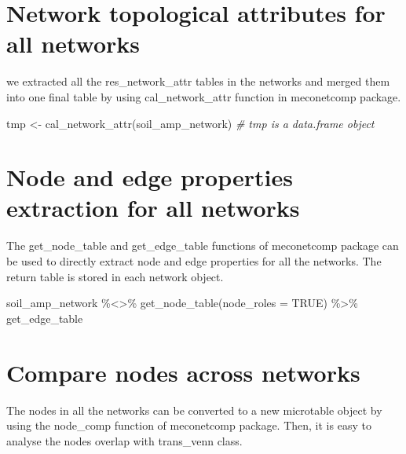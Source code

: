\documentclass[
]{book}
\newenvironment{Shaded}{\begin{snugshade}}{\end{snugshade}}
\newcommand{\AttributeTok}[1]{\textcolor[rgb]{0.77,0.63,0.00}{#1}}
\newcommand{\CommentTok}[1]{\textcolor[rgb]{0.56,0.35,0.01}{\textit{#1}}}
\newcommand{\ConstantTok}[1]{\textcolor[rgb]{0.00,0.00,0.00}{#1}}
\newcommand{\FunctionTok}[1]{\textcolor[rgb]{0.00,0.00,0.00}{#1}}
\newcommand{\NormalTok}[1]{#1}
\newcommand{\OtherTok}[1]{\textcolor[rgb]{0.56,0.35,0.01}{#1}}
\newcommand{\SpecialCharTok}[1]{\textcolor[rgb]{0.00,0.00,0.00}{#1}}
\begin{document}
\hypertarget{network-topological-attributes-for-all-networks}{%
\section{Network topological attributes for all networks}\label{network-topological-attributes-for-all-networks}}

we extracted all the res\_network\_attr tables in the networks and merged them into one final table by using cal\_network\_attr function in meconetcomp package.

\begin{Shaded}
\begin{Highlighting}[]
\NormalTok{tmp }\OtherTok{\textless{}{-}} \FunctionTok{cal\_network\_attr}\NormalTok{(soil\_amp\_network)}
\CommentTok{\# tmp is a data.frame object}
\end{Highlighting}
\end{Shaded}

\hypertarget{node-and-edge-properties-extraction-for-all-networks}{%
\section{Node and edge properties extraction for all networks}\label{node-and-edge-properties-extraction-for-all-networks}}

The get\_node\_table and get\_edge\_table functions of meconetcomp package can be used to directly extract node and edge properties for all the networks.
The return table is stored in each network object.

\begin{Shaded}
\begin{Highlighting}[]
\NormalTok{soil\_amp\_network }\SpecialCharTok{\%\textless{}\textgreater{}\%} \FunctionTok{get\_node\_table}\NormalTok{(}\AttributeTok{node\_roles =} \ConstantTok{TRUE}\NormalTok{) }\SpecialCharTok{\%\textgreater{}\%}\NormalTok{ get\_edge\_table}
\end{Highlighting}
\end{Shaded}

\hypertarget{compare-nodes-across-networks}{%
\section{Compare nodes across networks}\label{compare-nodes-across-networks}}

The nodes in all the networks can be converted to a new microtable object by using the node\_comp function of meconetcomp package.
Then, it is easy to analyse the nodes overlap with trans\_venn class.
\end{document}
